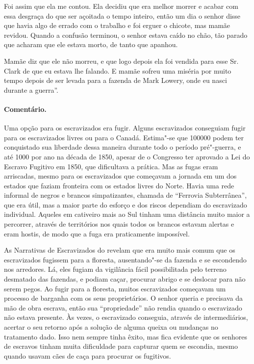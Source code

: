 Foi assim que ela me contou. Ela decidiu que era melhor morrer e acabar
com essa desgraça do que ser açoitada o tempo inteiro, então um dia o
senhor disse que havia algo de errado com o trabalho e foi erguer o
chicote, mas mamãe revidou. Quando a confusão terminou, o senhor estava
caído no chão, tão parado que acharam que ele estava morto, de tanto que
apanhou.

Mamãe diz que ele não morreu, e que logo depois ela foi vendida para
esse Sr. Clark de que eu estava lhe falando. E mamãe sofreu uma miséria
por muito tempo depois de ser levada para a fazenda de Mark Lowery, onde
eu nasci durante a guerra''.

\paragraph{Comentário.}\quad
{\small
Uma opção para os escravizados era fugir. Alguns escravizados conseguiam
fugir para os escravizados livres ou para o Canadá. Estima"-se que 100000
podem ter conquistado sua liberdade dessa maneira durante todo o período
pré"-guerra, e até 1000 por ano na década de 1850, apesar de o Congresso
ter aprovado a Lei do Escravo Fugitivo em 1850, que dificultava a
prática. Mas as fugas eram arriscadas, mesmo para os escravizados que
começavam a jornada em um dos estados que faziam fronteira com os
estados livres do Norte. Havia uma rede informal de negros e brancos
simpatizantes, chamada de ``Ferrovia Subterrânea'', que era útil, mas a
maior parte do esforço e dos riscos dependiam do escravizado individual.
Aqueles em cativeiro mais ao Sul tinham uma distância muito maior a
percorrer, através de territórios nos quais todos os brancos estavam
alertas e eram hostis, de modo que a fuga era praticamente impossível.

As Narrativas de Escravizados do  revelam que era muito mais comum
que os escravizados fugissem para a floresta, ausentando"-se da fazenda e se
escondendo nos arredores. Lá, eles fugiam da vigilância fácil
possibilitada pelo terreno desmatado das fazendas, e podiam caçar,
procurar abrigo e se deslocar para não serem pegos. Ao fugir para a
floresta, muitos escravizados começavam um processo de barganha com os seus
proprietários. O senhor queria e precisava da mão de obra escrava, então
sua ``propriedade'' não rendia quando o escravizado não estava presente. Às
vezes, o escravizado conseguia, através de intermediários, acertar o seu
retorno após a solução de alguma queixa ou mudanças no tratamento dado.
Isso nem sempre tinha êxito, mas fica evidente que os senhores de
escravos tinham muita dificuldade para capturar quem se escondia, mesmo
quando usavam cães de caça para procurar os fugitivos.
}

